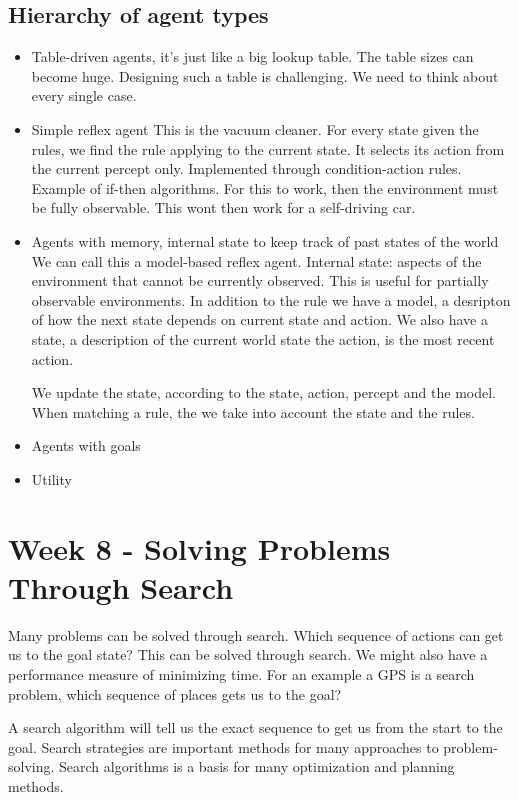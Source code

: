 \documentclass{article}
\begin{document}
\subsection{Hierarchy of agent types}%
\label{sub:hieryachy_of_agent_types}
\begin{itemize}
  \item Table-driven agents, it's just like a big lookup table. 
    \subitem The table sizes can become huge. Designing such a table is
    challenging. We need to think about every single case.
  \item Simple reflex agent
    \subitem This is the vacuum cleaner. For every state given the rules, we
    find the rule applying to the current state. It selects its action from the
    current percept only. Implemented through condition-action rules. Example of
    if-then algorithms. For this to work, then the environment must be fully
    observable. This wont then work for a self-driving car.
  \item Agents with memory, internal state to keep track of past states of the
    world
    \subitem We can call this a model-based reflex agent. Internal state:
    aspects of the environment that cannot be currently observed. This is useful
    for partially observable environments.
    In addition to the rule we have a model, a desripton of how the next state
    depends on current state and action.
    We also have a state, a description of the current world state
    the action, is the most recent action.

    We update the state, according to the state, action, percept and the model.
    When matching a rule, the we take into account the state and the rules.
  \item Agents with goals
    \subitem 
  \item Utility 
\end{itemize}


\newpage

\section{Week 8 - Solving Problems Through Search}

Many problems can be solved through search. Which sequence of actions can get us
to the goal state? This can be solved through search. We might also have a
performance measure of minimizing time. For an example a GPS is a search
problem, which sequence of places gets us to the goal? 

A search algorithm will tell us the exact sequence to get us from the start to
the goal. Search strategies are important methods for many approaches to
problem-solving. Search algorithms is a basis for many optimization and planning
methods.
\end{document}
